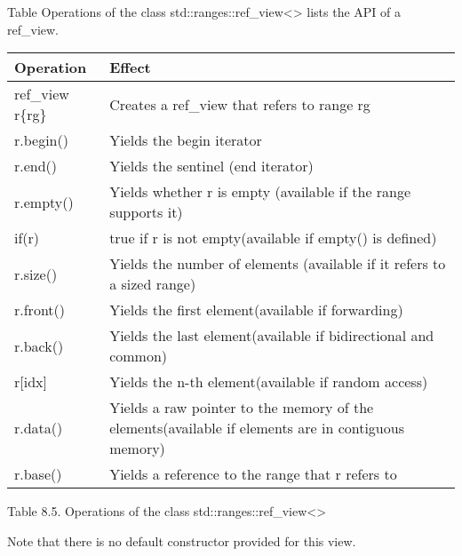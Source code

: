 Table Operations of the class std::ranges::ref\_view<> lists the API of a ref\_view.

\begin{longtable}[c]{|l|l|}
	\hline
	\textbf{Operation} & \textbf{Effect}                                                \\ \hline
	\endfirsthead
	\endhead
	ref\_view r\{rg\}  & Creates a ref\_view that refers to range rg                    \\ \hline
	r.begin()          & Yields the begin iterator                                      \\ \hline
	r.end()            & Yields the sentinel (end iterator)                             \\ \hline
	r.empty()          & Yields whether r is empty (available if the range supports it) \\ \hline
	if(r)              & true if r is not empty(available if empty() is defined)        \\ \hline
	r.size() & Yields the number of elements (available if it refers to a sized range)                            \\ \hline
	r.front()          & Yields the first element(available if forwarding)              \\ \hline
	r.back()           & Yields the last element(available if bidirectional and common) \\ \hline
	r{[}idx{]}         & Yields the n-th element(available if random access)            \\ \hline
	r.data() & Yields a raw pointer to the memory of the elements(available if elements are in contiguous memory) \\ \hline
	r.base()           & Yields a reference to the range that r refers to               \\ \hline
\end{longtable}

\begin{center}
Table 8.5. Operations of the class std::ranges::ref\_view<>
\end{center}

Note that there is no default constructor provided for this view.



